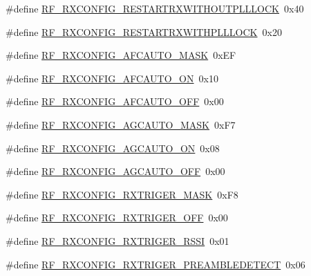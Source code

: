 \begin{DoxyCompactItemize}
\item 
\#define \mbox{\hyperlink{sx1276_regs-_fsk_8h_afe5d2d617bc8305d563ddf6bdf6f525b}{R\+F\+\_\+\+R\+X\+C\+O\+N\+F\+I\+G\+\_\+\+R\+E\+S\+T\+A\+R\+T\+R\+X\+W\+I\+T\+H\+O\+U\+T\+P\+L\+L\+L\+O\+CK}}~0x40
\item 
\#define \mbox{\hyperlink{sx1276_regs-_fsk_8h_a89ca1a06f70efe28c16331278cfb2e55}{R\+F\+\_\+\+R\+X\+C\+O\+N\+F\+I\+G\+\_\+\+R\+E\+S\+T\+A\+R\+T\+R\+X\+W\+I\+T\+H\+P\+L\+L\+L\+O\+CK}}~0x20
\item 
\#define \mbox{\hyperlink{sx1276_regs-_fsk_8h_aad8947af15105d6b90d75d761439aa23}{R\+F\+\_\+\+R\+X\+C\+O\+N\+F\+I\+G\+\_\+\+A\+F\+C\+A\+U\+T\+O\+\_\+\+M\+A\+SK}}~0x\+EF
\item 
\#define \mbox{\hyperlink{sx1276_regs-_fsk_8h_a1565ab71874bf162f92304ed92a3560c}{R\+F\+\_\+\+R\+X\+C\+O\+N\+F\+I\+G\+\_\+\+A\+F\+C\+A\+U\+T\+O\+\_\+\+ON}}~0x10
\item 
\#define \mbox{\hyperlink{sx1276_regs-_fsk_8h_a46775e0fe6e7798c4f50aa1527a5e454}{R\+F\+\_\+\+R\+X\+C\+O\+N\+F\+I\+G\+\_\+\+A\+F\+C\+A\+U\+T\+O\+\_\+\+O\+FF}}~0x00
\item 
\#define \mbox{\hyperlink{sx1276_regs-_fsk_8h_a20bbc62b9e34c66596d9152d8d1c18ac}{R\+F\+\_\+\+R\+X\+C\+O\+N\+F\+I\+G\+\_\+\+A\+G\+C\+A\+U\+T\+O\+\_\+\+M\+A\+SK}}~0x\+F7
\item 
\#define \mbox{\hyperlink{sx1276_regs-_fsk_8h_a6d9c9a618b195915a59cfffeae490a76}{R\+F\+\_\+\+R\+X\+C\+O\+N\+F\+I\+G\+\_\+\+A\+G\+C\+A\+U\+T\+O\+\_\+\+ON}}~0x08
\item 
\#define \mbox{\hyperlink{sx1276_regs-_fsk_8h_acae238b6c7912d2900ef6f6a66eff67c}{R\+F\+\_\+\+R\+X\+C\+O\+N\+F\+I\+G\+\_\+\+A\+G\+C\+A\+U\+T\+O\+\_\+\+O\+FF}}~0x00
\item 
\#define \mbox{\hyperlink{sx1276_regs-_fsk_8h_a6484d9c4b47e7a5860ad4d2ffa85f7fc}{R\+F\+\_\+\+R\+X\+C\+O\+N\+F\+I\+G\+\_\+\+R\+X\+T\+R\+I\+G\+E\+R\+\_\+\+M\+A\+SK}}~0x\+F8
\item 
\#define \mbox{\hyperlink{sx1276_regs-_fsk_8h_ab7bc69d7042e25e9e1c38cc4a82d5510}{R\+F\+\_\+\+R\+X\+C\+O\+N\+F\+I\+G\+\_\+\+R\+X\+T\+R\+I\+G\+E\+R\+\_\+\+O\+FF}}~0x00
\item 
\#define \mbox{\hyperlink{sx1276_regs-_fsk_8h_a9c49c770ce3e8a7629c47d1c1485a9b3}{R\+F\+\_\+\+R\+X\+C\+O\+N\+F\+I\+G\+\_\+\+R\+X\+T\+R\+I\+G\+E\+R\+\_\+\+R\+S\+SI}}~0x01
\item 
\#define \mbox{\hyperlink{sx1276_regs-_fsk_8h_a46818be362acfd8e971b2ba909a5bd48}{R\+F\+\_\+\+R\+X\+C\+O\+N\+F\+I\+G\+\_\+\+R\+X\+T\+R\+I\+G\+E\+R\+\_\+\+P\+R\+E\+A\+M\+B\+L\+E\+D\+E\+T\+E\+CT}}~0x06

\end{DoxyCompactItemize}

